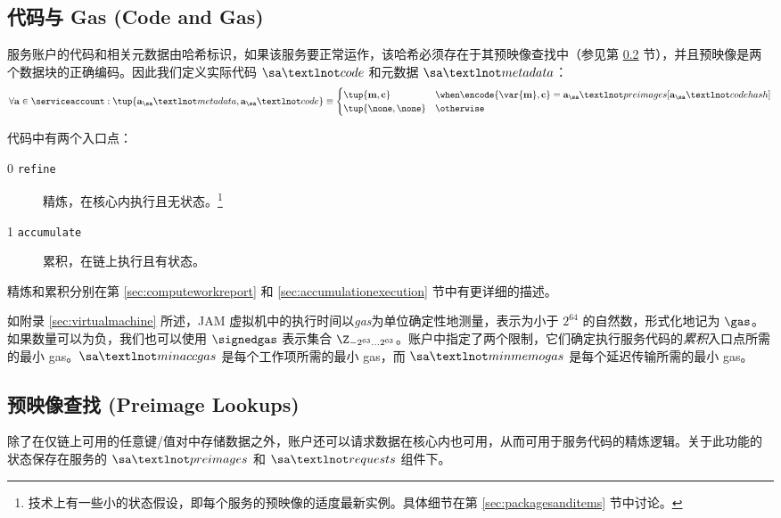 \subsection{代码与 Gas (Code and Gas)}

服务账户的代码和相关元数据由哈希标识，如果该服务要正常运作，该哈希必须存在于其预映像查找中（参见第 \ref{sec:lookups} 节），并且预映像是两个数据块的正确编码。因此我们定义实际代码 $\sa¬code$ 和元数据 $\sa¬metadata$：
\begin{align}
  \forall \mathbf{a} \in \serviceaccount : \tup{\mathbf{a}_\sa¬metadata, \mathbf{a}_\sa¬code} \equiv \begin{cases}
    \tup{\mathbf{m}, \mathbf{c}} &\when \encode{\var{\mathbf{m}}, \mathbf{c}} = \mathbf{a}_\sa¬preimages[\mathbf{a}_\sa¬codehash] \\
    \tup{\none, \none} &\otherwise
  \end{cases}
\end{align}

代码中有两个入口点：
\begin{description}
  \item[0 \texttt{refine}]精炼，在核心内执行且无状态。\footnote{技术上有一些小的状态假设，即每个服务的预映像的适度最新实例。具体细节在第 \ref{sec:packagesanditems} 节中讨论。}
  \item[1 \texttt{accumulate}] 累积，在链上执行且有状态。
\end{description}

精炼和累积分别在第 \ref{sec:computeworkreport} 和 \ref{sec:accumulationexecution} 节中有更详细的描述。

如附录 \ref{sec:virtualmachine} 所述，JAM 虚拟机中的执行时间以\emph{gas}为单位确定性地测量，表示为小于 $2^{64}$ 的自然数，形式化地记为 $\gas$。如果数量可以为负，我们也可以使用 $\signedgas$ 表示集合 $\Z_{-2^{63}\dots2^{63}}$。账户中指定了两个限制，它们确定执行服务代码的\emph{累积}入口点所需的最小 gas。$\sa¬minaccgas$ 是每个工作项所需的最小 gas，而 $\sa¬minmemogas$ 是每个延迟传输所需的最小 gas。




\subsection{预映像查找 (Preimage Lookups)}\label{sec:lookups}

除了在仅链上可用的任意键/值对中存储数据之外，账户还可以请求数据在核心内也可用，从而可用于服务代码的精炼逻辑。关于此功能的状态保存在服务的 $\sa¬preimages$ 和 $\sa¬requests$ 组件下。

